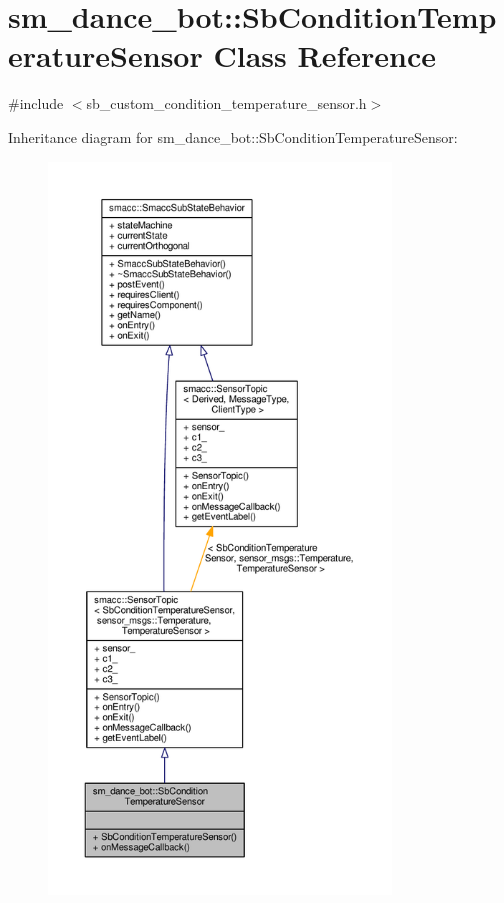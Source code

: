 \hypertarget{classsm__dance__bot_1_1SbConditionTemperatureSensor}{}\section{sm\+\_\+dance\+\_\+bot\+:\+:Sb\+Condition\+Temperature\+Sensor Class Reference}
\label{classsm__dance__bot_1_1SbConditionTemperatureSensor}


{\ttfamily \#include $<$sb\+\_\+custom\+\_\+condition\+\_\+temperature\+\_\+sensor.\+h$>$}



Inheritance diagram for sm\+\_\+dance\+\_\+bot\+:\+:Sb\+Condition\+Temperature\+Sensor\+:
\nopagebreak
\begin{figure}[H]
\begin{center}
\leavevmode
\includegraphics[height=550pt]{classsm__dance__bot_1_1SbConditionTemperatureSensor__inherit__graph}
\end{center}
\end{figure}


